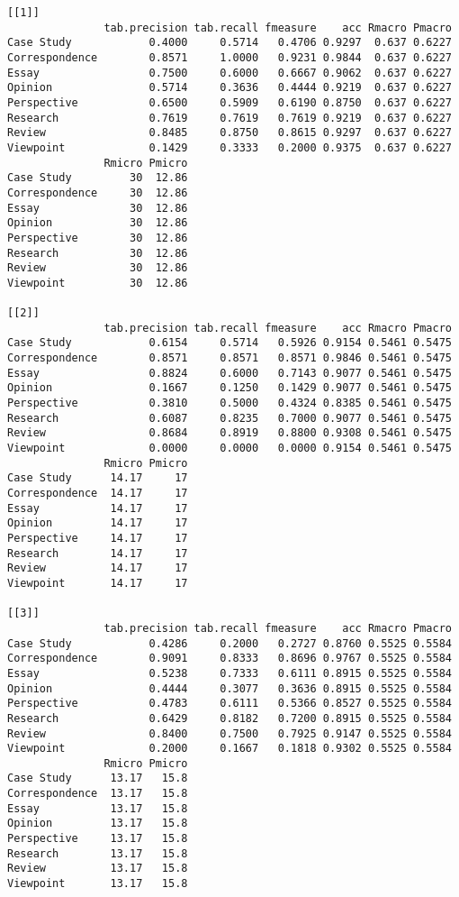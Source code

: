 \documentclass[]{article}
\begin{document}
\begin{lstlisting}[frame=single]
[[1]]
               tab.precision tab.recall fmeasure    acc Rmacro Pmacro
Case Study            0.4000     0.5714   0.4706 0.9297  0.637 0.6227
Correspondence        0.8571     1.0000   0.9231 0.9844  0.637 0.6227
Essay                 0.7500     0.6000   0.6667 0.9062  0.637 0.6227
Opinion               0.5714     0.3636   0.4444 0.9219  0.637 0.6227
Perspective           0.6500     0.5909   0.6190 0.8750  0.637 0.6227
Research              0.7619     0.7619   0.7619 0.9219  0.637 0.6227
Review                0.8485     0.8750   0.8615 0.9297  0.637 0.6227
Viewpoint             0.1429     0.3333   0.2000 0.9375  0.637 0.6227
               Rmicro Pmicro
Case Study         30  12.86
Correspondence     30  12.86
Essay              30  12.86
Opinion            30  12.86
Perspective        30  12.86
Research           30  12.86
Review             30  12.86
Viewpoint          30  12.86

[[2]]
               tab.precision tab.recall fmeasure    acc Rmacro Pmacro
Case Study            0.6154     0.5714   0.5926 0.9154 0.5461 0.5475
Correspondence        0.8571     0.8571   0.8571 0.9846 0.5461 0.5475
Essay                 0.8824     0.6000   0.7143 0.9077 0.5461 0.5475
Opinion               0.1667     0.1250   0.1429 0.9077 0.5461 0.5475
Perspective           0.3810     0.5000   0.4324 0.8385 0.5461 0.5475
Research              0.6087     0.8235   0.7000 0.9077 0.5461 0.5475
Review                0.8684     0.8919   0.8800 0.9308 0.5461 0.5475
Viewpoint             0.0000     0.0000   0.0000 0.9154 0.5461 0.5475
               Rmicro Pmicro
Case Study      14.17     17
Correspondence  14.17     17
Essay           14.17     17
Opinion         14.17     17
Perspective     14.17     17
Research        14.17     17
Review          14.17     17
Viewpoint       14.17     17

[[3]]
               tab.precision tab.recall fmeasure    acc Rmacro Pmacro
Case Study            0.4286     0.2000   0.2727 0.8760 0.5525 0.5584
Correspondence        0.9091     0.8333   0.8696 0.9767 0.5525 0.5584
Essay                 0.5238     0.7333   0.6111 0.8915 0.5525 0.5584
Opinion               0.4444     0.3077   0.3636 0.8915 0.5525 0.5584
Perspective           0.4783     0.6111   0.5366 0.8527 0.5525 0.5584
Research              0.6429     0.8182   0.7200 0.8915 0.5525 0.5584
Review                0.8400     0.7500   0.7925 0.9147 0.5525 0.5584
Viewpoint             0.2000     0.1667   0.1818 0.9302 0.5525 0.5584
               Rmicro Pmicro
Case Study      13.17   15.8
Correspondence  13.17   15.8
Essay           13.17   15.8
Opinion         13.17   15.8
Perspective     13.17   15.8
Research        13.17   15.8
Review          13.17   15.8
Viewpoint       13.17   15.8


\end{lstlisting}
\end{document}
